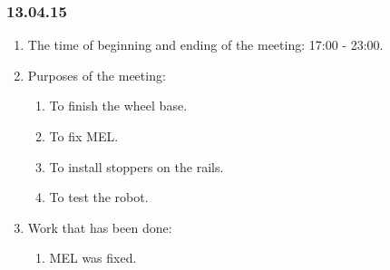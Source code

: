 \subsubsection{13.04.15}
\begin{enumerate}
	
	\item The time of beginning and ending of the meeting: 17:00 - 23:00.
	
	\item Purposes of the meeting: 
	\begin{enumerate}
		
		\item To finish the wheel base.
		
		\item To fix MEL.
		
		\item To install stoppers on the rails.
		
		\item To test the robot.
		
	\end{enumerate}
	
	\item Work that has been done:
	\begin{enumerate}
				
		\item MEL was fixed.
		\begin{figure}[H]
			\begin{minipage}[h]{0.2\linewidth}
				\center  
			\end{minipage}
			\begin{minipage}[h]{0.6\linewidth}
				\caption{}
			\end{minipage}
		\end{figure}
		

\end{enumerate}
\end{enumerate}

